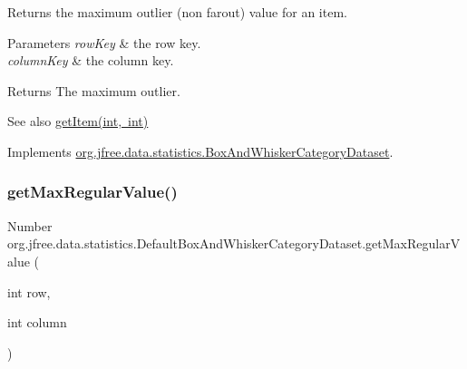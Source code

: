 Returns the maximum outlier (non farout) value for an item.


\begin{DoxyParams}{Parameters}
{\em row\+Key} & the row key. \\
\hline
{\em column\+Key} & the column key.\\
\hline
\end{DoxyParams}
\begin{DoxyReturn}{Returns}
The maximum outlier.
\end{DoxyReturn}
\begin{DoxySeeAlso}{See also}
\mbox{\hyperlink{classorg_1_1jfree_1_1data_1_1statistics_1_1_default_box_and_whisker_category_dataset_a85c944b06e4337059ea728b3a744e2a9}{get\+Item(int, int)}} 
\end{DoxySeeAlso}


Implements \mbox{\hyperlink{interfaceorg_1_1jfree_1_1data_1_1statistics_1_1_box_and_whisker_category_dataset_a72450d83de5ee798edf42bda87232f1d}{org.\+jfree.\+data.\+statistics.\+Box\+And\+Whisker\+Category\+Dataset}}.

\mbox{\label{classorg_1_1jfree_1_1data_1_1statistics_1_1_default_box_and_whisker_category_dataset_aef4d0917b5702237fdd138fda594fc24}} 
\subsubsection{\texorpdfstring{get\+Max\+Regular\+Value()}{getMaxRegularValue()}\hspace{0.1cm}{\footnotesize\ttfamily [1/2]}}
{\footnotesize\ttfamily Number org.\+jfree.\+data.\+statistics.\+Default\+Box\+And\+Whisker\+Category\+Dataset.\+get\+Max\+Regular\+Value (\begin{DoxyParamCaption}\item[{int}]{row,  }\item[{int}]{column }\end{DoxyParamCaption})}

